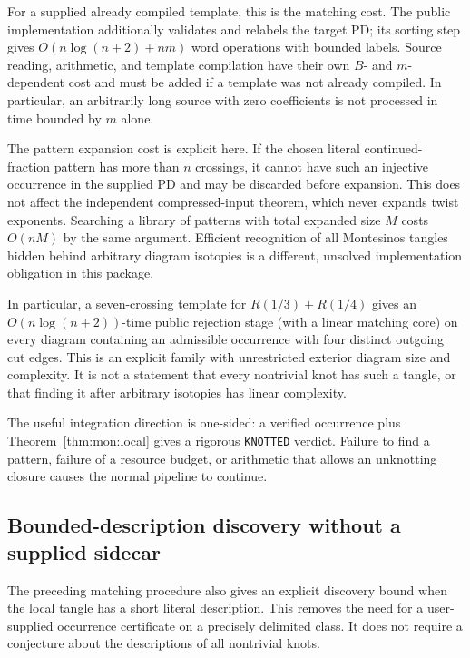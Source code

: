 For a supplied already compiled template, this is the matching cost.
The public implementation additionally validates and relabels the target PD;
its sorting step gives $O(n\log(n+2)+nm)$ word operations with bounded labels.
Source reading, arithmetic, and template compilation have their own $B$- and
$m$-dependent cost and must be added if a template was not already compiled.
In particular, an arbitrarily long source with zero coefficients is not
processed in time bounded by $m$ alone.

The pattern expansion cost is explicit here.  If the chosen literal
continued-fraction pattern has more than $n$ crossings, it cannot have such
an injective occurrence in the supplied PD and may be discarded before
expansion.  This does not affect the independent compressed-input theorem,
which never expands twist exponents.  Searching a library of patterns with
total expanded size $M$ costs $O(nM)$ by the same argument.  Efficient
recognition of all Montesinos tangles hidden behind arbitrary diagram
isotopies is a different, unsolved implementation obligation in this package.

In particular, a seven-crossing template for $R(1/3)+R(1/4)$ gives an
$O(n\log(n+2))$-time public rejection stage (with a linear matching core) on every diagram containing
an admissible occurrence with four distinct outgoing cut edges.  This is an explicit family with unrestricted
exterior diagram size and complexity.  It is not a statement that every
nontrivial knot has such a tangle, or that finding it after arbitrary isotopies
has linear complexity.

The useful integration direction is one-sided: a verified occurrence plus
Theorem~\ref{thm:mon:local} gives a rigorous \texttt{KNOTTED} verdict.
Failure to find a pattern, failure of a resource budget, or arithmetic that
allows an unknotting closure causes the normal pipeline to continue.

\subsection{Bounded-description discovery without a supplied sidecar}

The preceding matching procedure also gives an explicit discovery bound when
the local tangle has a short literal description.  This removes the need for
a user-supplied occurrence certificate on a precisely delimited class.  It
does not require a conjecture about the descriptions of all nontrivial knots.

